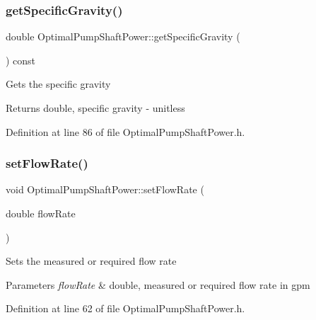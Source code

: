 \subsubsection{\texorpdfstring{get\+Specific\+Gravity()}{getSpecificGravity()}}
{\footnotesize\ttfamily double Optimal\+Pump\+Shaft\+Power\+::get\+Specific\+Gravity (\begin{DoxyParamCaption}{ }\end{DoxyParamCaption}) const\hspace{0.3cm}{\ttfamily [inline]}}

Gets the specific gravity \begin{DoxyReturn}{Returns}
double, specific gravity -\/ unitless 
\end{DoxyReturn}


Definition at line 86 of file Optimal\+Pump\+Shaft\+Power.\+h.

\mbox{\label{class_optimal_pump_shaft_power_a38efdee39db4c3856915f1ab26d44ed2}} 
\subsubsection{\texorpdfstring{set\+Flow\+Rate()}{setFlowRate()}}
{\footnotesize\ttfamily void Optimal\+Pump\+Shaft\+Power\+::set\+Flow\+Rate (\begin{DoxyParamCaption}\item[{double}]{flow\+Rate }\end{DoxyParamCaption})\hspace{0.3cm}{\ttfamily [inline]}}

Sets the measured or required flow rate 
\begin{DoxyParams}{Parameters}
{\em flow\+Rate} & double, measured or required flow rate in gpm \\
\hline
\end{DoxyParams}


Definition at line 62 of file Optimal\+Pump\+Shaft\+Power.\+h.

\mbox{\label{class_optimal_pump_shaft_power_aa080c62ff92fc70a4e27e7710e490b62}} 
